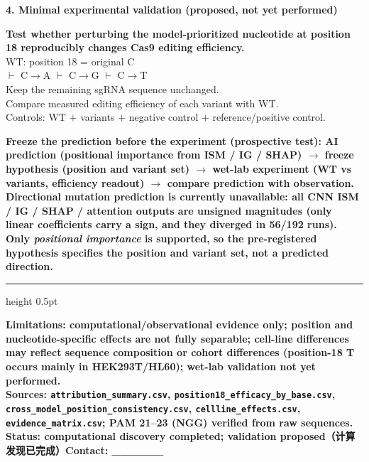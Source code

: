 \documentclass[10pt,a4paper]{ctexart}
\newcommand{\bd}[1]{\fontsize{8.5}{10.2}\selectfont\textbf{#1}}
\newcommand{\bt}[1]{\fontsize{8.5}{10.2}\selectfont #1}
\newcommand{\sm}[1]{\fontsize{7.5}{9.0}\selectfont #1}
\begin{document}
{\color{acc}\bd{4. Minimal experimental validation (proposed, not yet performed)}}\\[1pt]
\begin{minipage}[t]{0.40\textwidth}
\bt{\textbf{Test whether perturbing the model-prioritized nucleotide at position 18 reproducibly changes Cas9 editing efficiency.}}\\[1pt]
\sm{WT: position 18 = original C\\
\hspace{1em}$\vdash$ C$\rightarrow$A \quad $\vdash$ C$\rightarrow$G \quad $\vdash$ C$\rightarrow$T\\
Keep the remaining sgRNA sequence unchanged.\\
Compare measured editing efficiency of each variant with WT.\\
Controls: WT $+$ variants $+$ negative control $+$ reference/positive control.}
\end{minipage}\hfill
\begin{minipage}[t]{0.575\textwidth}
\sm{\bfseries Freeze the prediction before the experiment (prospective test):} \sm{AI prediction (positional importance from ISM / IG / SHAP) $\rightarrow$ freeze hypothesis (position and variant set) $\rightarrow$ wet-lab experiment (WT vs variants, efficiency readout) $\rightarrow$ compare prediction with observation.}\\[1.5pt]
\sm{\color{warn}Directional mutation prediction is currently unavailable: all CNN ISM / IG / SHAP / attention outputs are unsigned magnitudes (only linear coefficients carry a sign, and they diverged in 56/192 runs). Only \emph{positional importance} is supported, so the pre-registered hypothesis specifies the position and variant set, not a predicted direction.}
\end{minipage}

\vspace{2pt}
{\color{acc}\hrule height 0.5pt}
\vspace{1pt}
\sm{\bfseries Limitations:} \sm{computational/observational evidence only; position and nucleotide-specific effects are not fully separable; cell-line differences may reflect sequence composition or cohort differences (position-18 T occurs mainly in HEK293T/HL60); wet-lab validation not yet performed.}\\[1pt]
\sm{\bfseries Sources:} \sm{\texttt{attribution\_summary.csv}, \texttt{position18\_efficacy\_by\_base.csv}, \texttt{cross\_model\_position\_consistency.csv}, \texttt{cellline\_effects.csv}, \texttt{evidence\_matrix.csv}; PAM 21--23 (NGG) verified from raw sequences. \quad\bfseries Status: computational discovery completed; validation proposed（计算发现已完成）\quad Contact: \_\_\_\_\_\_}
\end{document}

